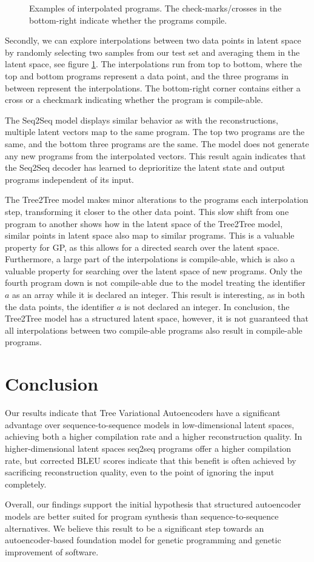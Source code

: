 \begin{figure}
    \caption{Examples of interpolated programs. The check-marks/crosses in the bottom-right indicate whether the programs compile.}
    \label{fig:interpolation_examples}
\end{figure}

Secondly, we can explore interpolations between two data points in latent space by randomly selecting two samples from our test set and averaging them in the latent space, see figure \ref{fig:interpolation_examples}. The interpolations run from top to bottom, where the top and bottom programs represent a data point, and the three programs in between represent the interpolations. The bottom-right corner contains either a cross or a checkmark indicating whether the program is compile-able.


The Seq2Seq model displays similar behavior as with the reconstructions, multiple latent vectors map to the same program. The top two programs are the same, and the bottom three programs are the same. The model does not generate any new programs from the interpolated vectors. This result again indicates that the Seq2Seq decoder has learned to deprioritize the latent state and output programs independent of its input. 

The Tree2Tree model makes minor alterations to the programs each interpolation step, transforming it closer to the other data point. This slow shift from one program to another shows how in the latent space of the Tree2Tree model, similar points in latent space also map to similar programs. This is a valuable property for GP, as this allows for a directed search over the latent space. Furthermore, a large part of the interpolations is compile-able, which is also a valuable property for searching over the latent space of new programs. Only the fourth program down is not compile-able due to the model treating the identifier $a$ as an array while it is declared an integer. This result is interesting, as in both the data points, the identifier $a$ is not declared an integer. In conclusion, the Tree2Tree model has a structured latent space, however, it is not guaranteed that all interpolations between two compile-able programs also result in compile-able programs.
\newpage
\section{Conclusion}

Our results indicate that Tree Variational Autoencoders have a significant advantage over sequence-to-sequence models in low-dimensional latent spaces, achieving both a higher compilation rate and a higher reconstruction quality.
In higher-dimensional latent spaces seq2seq programs offer a higher compilation rate, but corrected BLEU scores indicate that this benefit is often achieved by sacrificing reconstruction quality, even to the point of ignoring the input completely.

Overall, our findings support the initial hypothesis that structured autoencoder models are better suited for program synthesis than sequence-to-sequence alternatives.
We believe this result to be a significant step towards an autoencoder-based foundation model for genetic programming and genetic improvement of software.